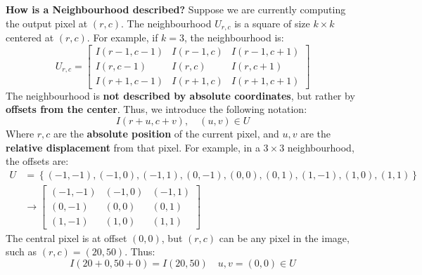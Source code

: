 \highspace
\textcolor{Green3}{ \textbf{How is a Neighbourhood described?}} Suppose we are currently computing the output pixel at $\left(r,c\right)$. The neighbourhood $U_{r,c}$ is a square of size $k \times k$ centered at $\left(r,c\right)$. For example, if $k=3$, the neighbourhood is:
\begin{equation*}
    U_{r,c} = \begin{bmatrix}
        I(r-1,c-1) & I(r-1,c) & I(r-1,c+1) \\
        I(r,c-1) & I(r,c) & I(r,c+1) \\
        I(r+1,c-1) & I(r+1,c) & I(r+1,c+1)
    \end{bmatrix}
\end{equation*}
The neighbourhood is \textbf{not described by absolute coordinates}, but rather by \textbf{offsets from the center}. Thus, we introduce the following notation:
\begin{equation*}
    I\left(r + u, c + v\right), \quad \left(u,v\right) \in U
\end{equation*}
Where $r,c$ are the \textbf{absolute position} of the current pixel, and $u,v$ are the \textbf{relative displacement} from that pixel. For example, in a $3 \times 3$ neighbourhood, the offsets are:
\begin{align*}
    U &= \left\{(-1,-1), (-1,0), (-1,1), (0,-1), (0,0), (0,1), (1,-1), (1,0), (1,1)\right\} \\
    &\to \begin{bmatrix}
        (-1,-1) & (-1,0) & (-1,1) \\
        (0,-1) & (0,0) & (0,1) \\
        (1,-1) & (1,0) & (1,1)
    \end{bmatrix}
\end{align*}
The central pixel is at offset $(0,0)$, but $\left(r,c\right)$ can be any pixel in the image, such as $\left(r,c\right) = \left(20,50\right)$. Thus:
\begin{equation*}
    I\left(20 + 0, 50 + 0\right) = I(20,50) \quad u,v = (0,0) \in U
\end{equation*}

\newpage

